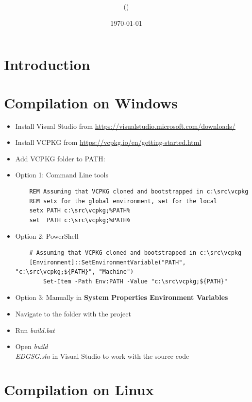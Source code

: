 \documentclass[12pt,a4paper,english]{article}
\title{\mySubject\\\myTitle}
\author{\myName (\myEmail)}
\date{\today}
\begin{document}
\section{Introduction}

\section{Compilation on Windows}

\begin{itemize}
    \item Install Visual Studio from \url{https://visualstudio.microsoft.com/downloads/}
    \item Install VCPKG from \url{https://vcpkg.io/en/getting-started.html}
    \item Add VCPKG folder to PATH:
    \item Option 1: Command Line tools

    \begin{verbatim}
    REM Assuming that VCPKG cloned and bootstrapped in c:\src\vcpkg
    REM setx for the global environment, set for the local
    setx PATH c:\src\vcpkg;%PATH%
    set  PATH c:\src\vcpkg;%PATH%
    \end{verbatim}

    \item Option 2: PowerShell
    \begin{verbatim}
    # Assuming that VCPKG cloned and bootstrapped in c:\src\vcpkg
    [Environment]::SetEnvironmentVariable("PATH", "c:\src\vcpkg;${PATH}", "Machine")
        Set-Item -Path Env:PATH -Value "c:\src\vcpkg;${PATH}"
    \end{verbatim}

    \item Option 3: Manually in \textbf{System Properties \text{-->} Environment Variables}
    \item Navigate to the folder with the project
    \item Run \textit{build.bat}
    \item Open \textit{build\\EDGSG.sln} in Visual Studio to work with the source code
\end{itemize}

\section{Compilation on Linux}
\end{document}
